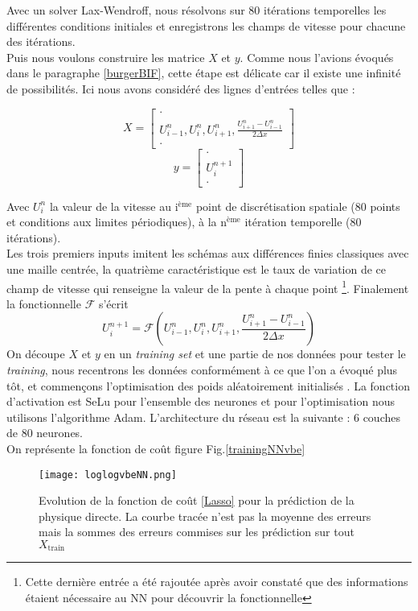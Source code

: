 \documentclass[a4paper,12pt]{article}
\newcommand{\bepar}[1]{
	\left( #1 \right)  
}
\numberwithin{equation}{section} %
\begin{document}
\noindent Avec un solver Lax-Wendroff, nous résolvons sur 80 itérations temporelles les différentes conditions initiales et enregistrons les champs de vitesse pour chacune des itérations.\\
Puis nous voulons construire les matrice $X$ et $y$. Comme nous l'avions évoqués dans le paragraphe \eqref{burgerBIF}, cette étape est délicate car il existe une infinité de possibilités. Ici nous avons considéré des lignes d'entrées telles que :
\begin{multicols}{2}
	\noindent
	$$ X = \left[ \begin{array}{c} \cdot \\ U^n_{i-1},U^n_{i}, U^n_{i+1}, \frac{U^n_{i+1} - U^n_{i-1}}{2\Delta x}  \\ \cdot 
					  \end{array}
		   \right]
	$$
	\columnbreak
	$$ y = \left[ \begin{array}{c} \cdot \\ U^{n+1}_i \\ \cdot 
			  \end{array}
	   \right]
	$$
	\end{multicols}
  
\noindent Avec $U_i^n$ la valeur de la vitesse au i$^{\text{ème}}$ point de discrétisation spatiale (80 points et conditions aux limites périodiques), à la n$^{\text{ème}}$ itération temporelle (80 itérations). \\
 Les trois premiers inputs imitent les schémas aux différences finies classiques avec une maille centrée, la quatrième caractéristique est le taux de variation de ce champ de vitesse qui renseigne la valeur de la pente à chaque point \footnote{Cette dernière entrée a été rajoutée après avoir constaté que des informations étaient nécessaire au NN pour découvrir la fonctionnelle}.
 Finalement la fonctionnelle $\mathcal{F}$ s'écrit $$U^{n+1}_i =  \mathcal{F}\bepar{U^n_{i-1},U^n_{i}, U^n_{i+1}, \frac{U^n_{i+1} - U^n_{i-1}}{2\Delta x}}$$
On découpe $X$ et $y$ en un \textit{training set} et une partie de nos données pour tester le \textit{training}, nous recentrons les données conformément à ce que l'on a évoqué plus tôt, et commençons l'optimisation des poids aléatoirement initialisés \citep{Goodfellow-et-al-2016}. La fonction d'activation est SeLu pour l'ensemble des neurones et pour l'optimisation nous utilisons l'algorithme Adam. L'architecture du réseau est la suivante : 6 couches de 80 neurones.\\
    On représente la fonction de coût figure Fig.\eqref{trainingNNvbe}
    \begin{figure}[!ht]
    \centering
    \texttt{[image: loglogvbeNN.png]}
    \caption{\small{Evolution de la fonction de coût \eqref{Lasso}} pour la prédiction de la physique directe. La courbe tracée n'est pas la moyenne des erreurs mais la sommes des erreurs commises sur les prédiction sur tout $X_{\text{train}}$ }
    \label{trainingNNvbe}
    \end{figure}
    
\end{document}
